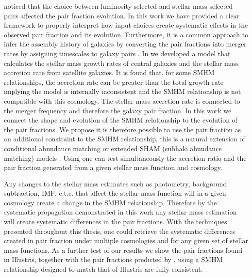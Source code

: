 \citet{Man2016RESOLVING03} noticed that the choice between luminosity-selected and stellar-mass selected pairs affected the pair fraction evolution. In this work we have provided a clear framework to properly interpret how input choices create systematic effects in the observed pair fraction and its evolution. Furthermore, it is a common approach to infer the assembly history of galaxies by converting the pair fractions into merger rates by assigning timescales to galaxy pairs \citep{Conselice2003A3,Conselice2008TheField,Mundy2017A3.5}. 
In  we developed a model that calculates the stellar mass growth rates of central galaxies and the stellar mass accretion rate from satellite galaxies.
It is found that, for some SMHM relationships, the accretion rate can be greater than the total growth rate implying the model is internally inconsistent and the SMHM relationship is not compatible with this \LCDM cosmology.
The stellar mass accretion rate is connected to the merger frequency and therefore the galaxy pair fraction. 
In this work we connect the shape and evolution of the SMHM relationship to the evolution of the pair fractions.
We propose it is therefore possible to use the pair fraction as an additional constraint to the SMHM relationship, this is a natural extension of conditional abundance matching or extended SHAM (subhalo abundance matching) models \citep{Hearin2013SHAMGroups}.
Using \steel one can test simultaneously the accretion ratio and the pair fraction generated from a given stellar mass function and cosmology.

Any changes to the stellar mass estimates such as photometry, background subtraction, IMF, e.t.c. that affect the stellar mass function will in a given cosmology create a change in the SMHM relationship. Therefore by the systematic propagation demonstrated in this work any stellar mass estimation will create systematic differences in the pair fractions. 
With the techniques presented throughout this thesis, one could retrieve the systematic differences created in pair fraction under multiple \LCDM cosmologies and for any given set of stellar mass functions. As a further test of our results we show the pair fractions found in Illustris, together with the pair fractions predicted by \steel, using a SMHM relationship designed to match
that of Illustris are fully consistent.


